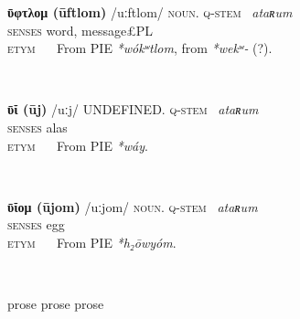 \documentclass[svgnames,x11names,b5paper]{book}
\newcommand{\dictentry}[7]{

\begin{minipage}{\textwidth}
\textbf{#1} \quad{} {/}{#2}{/} \quad{} \textsc{#3}. \quad{} \textsc{#4} ~\textit{#5} \\\vspace{4pt}
\textsc{senses} #6 \\\vspace{-2pt}
\textsc{etym} ~~ #7
\end{minipage}\\\vspace{8pt}

}
\begin{document}
\dictentry{ῡφτλομ (ūftlom)}{uːftlom}{noun}{q-stem}{ataʀum}{word, message£PL}{From PIE \textit{*wókʷtlom}, from \textit{*wekʷ-} (?).}
\dictentry{ῡῐ (ūj)}{uːj}{UNDEFINED}{q-stem}{ataʀum}{alas}{From PIE \textit{*wáy}.}
\dictentry{ῡῐομ (ūjom)}{uːjom}{noun}{q-stem}{ataʀum}{egg}{From PIE \textit{*h₂ōwyóm}.}
prose prose prose\\
\end{document}

